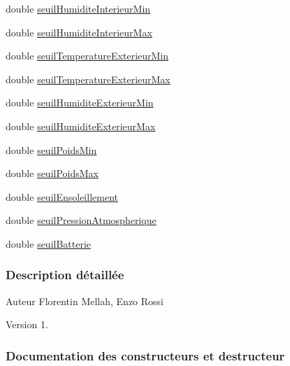 \begin{DoxyCompactItemize}
\item 
double \hyperlink{class_alertes_a501773587c8f2ccd032fe7db9af1f4e2}{seuil\+Humidite\+Interieur\+Min}
\item 
double \hyperlink{class_alertes_a795cd3721854335f6c91e6009b324c37}{seuil\+Humidite\+Interieur\+Max}
\item 
double \hyperlink{class_alertes_a0898c501edf5f07ac503b31b8a3d2454}{seuil\+Temperature\+Exterieur\+Min}
\item 
double \hyperlink{class_alertes_a207e0266c68ad378dae846382ba9f9dc}{seuil\+Temperature\+Exterieur\+Max}
\item 
double \hyperlink{class_alertes_a18afbc02513a6e4fa8baa665092719c9}{seuil\+Humidite\+Exterieur\+Min}
\item 
double \hyperlink{class_alertes_afa54793d1f47a97894faf91e76fb2a04}{seuil\+Humidite\+Exterieur\+Max}
\item 
double \hyperlink{class_alertes_a3f23bee8122888916e33559f4d0bf34b}{seuil\+Poids\+Min}
\item 
double \hyperlink{class_alertes_a19b88c68325ccc6e5e8ad11a2537b25e}{seuil\+Poids\+Max}
\item 
double \hyperlink{class_alertes_a7f512b6d3b5bc0851757ab4d18279ccf}{seuil\+Ensoleillement}
\item 
double \hyperlink{class_alertes_a565094789ef5eb0ae2a2a562ee8a9704}{seuil\+Pression\+Atmospherique}
\item 
double \hyperlink{class_alertes_a3ac4e5d2b1a8fdd9cf4633861948110f}{seuil\+Batterie}
\end{DoxyCompactItemize}


\subsubsection{Description détaillée}
\begin{DoxyAuthor}{Auteur}
Florentin Mellah, Enzo Rossi
\end{DoxyAuthor}
\begin{DoxyVersion}{Version}
1. 
\end{DoxyVersion}


\subsubsection{Documentation des constructeurs et destructeur}
\mbox{\label{class_alertes_ad2e4e3907f97bdd06840dfeee0a87ddb}} 
